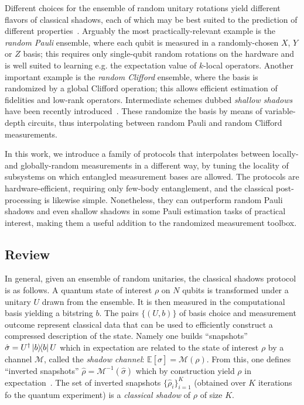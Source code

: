 \documentclass[a4paper,twocolumns,11pt,accepted=2024-03-04]{quantumarticle}
\begin{document}
Different choices for the ensemble of random unitary rotations yield different flavors of classical shadows, each of which may be best suited to the prediction of different properties~\cite{huang_predicting_2020}.
Arguably the most practically-relevant example is the {\it random Pauli} ensemble, where each qubit is measured in a randomly-chosen $X$, $Y$ or $Z$ basis; this requires only single-qubit random rotations on the hardware and is well suited to learning e.g. the expectation value of $k$-local operators. 
Another important example is the {\it random Clifford} ensemble, where the basis is randomized by a global Clifford operation; this allows efficient estimation of fidelities and low-rank operators. 
Intermediate schemes dubbed {\it shallow shadows} have been recently introduced~\cite{akhtar_scalable_2023,bertoni_shallow_2022,arienzo_closed-form_2022,ippoliti_operator_2023}. These randomize the basis by means of variable-depth circuits, thus interpolating between random Pauli and random Clifford measurements.

In this work, we introduce a family of protocols that interpolates between locally- and globally-random measurements in a different way, by tuning the locality of subsystems on which entangled measurement bases are allowed. 
The protocols are hardware-efficient, requiring only few-body entanglement, and the classical post-processing is likewise simple. Nonetheless, they can outperform random Pauli shadows and even shallow shadows in some Pauli estimation tasks of practical interest, making them a useful addition to the randomized measurement toolbox. 


\subsection{Review}

In general, given an ensemble of random unitaries, the classical shadows protocol is as follows. A quantum state of interest $\rho$ on $N$ qubits is transformed under a unitary $U$ drawn from the ensemble. It is then measured in the computational basis yielding a bitstring $b$. The pairs $\{ (U, b) \}$ of basis choice and measurement outcome represent classical data that can be used to efficiently construct a compressed description of the state. Namely one builds ``snapshots'' $\hat{\sigma} = U^\dagger \ketbra{b}{b} U$ which in expectation are related to the state of interest $\rho$ by a channel $\mathcal{M}$, called the {\it shadow channel}: $\mathbb{E}[\hat\sigma] = \mathcal{M}(\rho)$.
From this, one defines ``inverted snapshots'' $\hat{\rho} = \mathcal{M}^{-1}(\hat{\sigma})$ which by construction yield $\rho$ in expectation~\cite{huang_predicting_2020}. The set of inverted snapshots $\{\hat{\rho}_i\}_{i=1}^K$ (obtained over $K$ iterations fo the quantum experiment) is a {\it classical shadow} of $\rho$ of size $K$.
\end{document}
